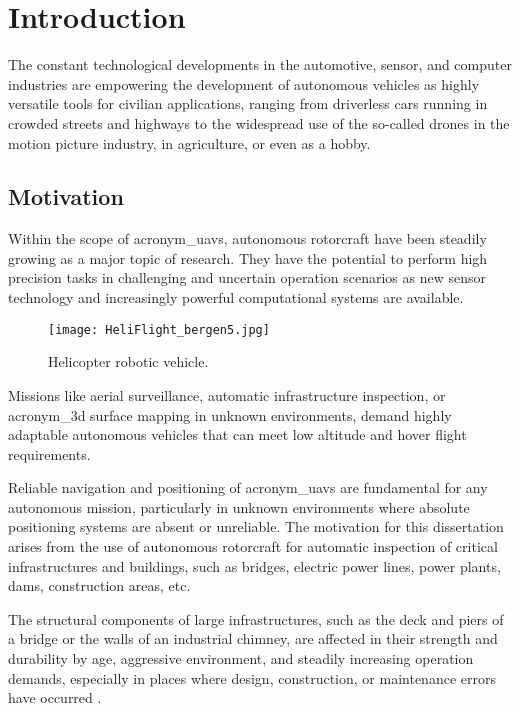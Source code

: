 \chapter{Introduction}
\label{ch:introduction}

The constant technological developments in the automotive, sensor, and computer 
industries are empowering the development of autonomous vehicles as highly versatile
tools for civilian applications, ranging from driverless cars running in crowded 
streets and highways to the widespread use of the so-called drones in the 
motion picture industry, in agriculture, or even as a hobby.

\section{Motivation}

Within the scope of \glspl{acronym_uav}, autonomous rotorcraft have been 
steadily growing as a major topic of research. 
They have the potential to perform high precision tasks in challenging and
uncertain operation scenarios as new sensor technology and increasingly powerful 
computational systems are available. 
\begin{figure}
    \centering
    \texttt{[image: HeliFlight\_bergen5.jpg]}\\
    \caption{Helicopter robotic vehicle.}
    \label{fig:bergen}
\end{figure}
Missions like aerial surveillance, automatic infrastructure inspection, or
\gls{acronym_3d} surface mapping in unknown environments, demand highly adaptable
autonomous vehicles that can meet low altitude and hover flight requirements.

Reliable navigation and positioning of \glspl{acronym_uav} are fundamental for 
any autonomous mission, particularly in unknown environments where absolute 
positioning systems are absent or unreliable.
The motivation for this dissertation arises from the use of autonomous 
rotorcraft for automatic inspection of critical infrastructures and buildings, 
such as bridges, electric power lines, power plants, dams, construction areas, etc. 

The structural components of large infrastructures, such as the deck and piers of
a bridge or the walls of an industrial chimney, are affected in their strength 
and durability by age, aggressive environment, and steadily increasing operation demands, 
especially in places where design, construction, or maintenance errors have occurred 
\citep{ice:2008,chimguide:2006}. 

